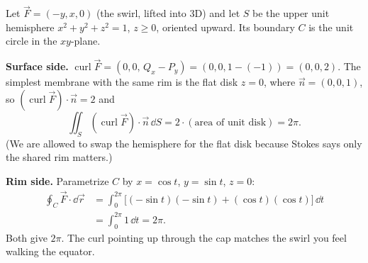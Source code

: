 \begin{example}
\label{ch35:ex-stokes}
Let $\vec F=(-y,x,0)$ (the swirl, lifted into 3D) and let $S$ be the upper unit
hemisphere $x^2+y^2+z^2=1$, $z\ge0$, oriented upward. Its boundary $C$ is the unit
circle in the $xy$-plane.

\textbf{Surface side.}
$\operatorname{curl}\vec F = (0,0,\,Q_x-P_y)=(0,0,1-(-1))=(0,0,2)$.
The simplest membrane with the same rim is the flat disk $z=0$, where
$\vec n=(0,0,1)$, so $(\operatorname{curl}\vec F)\cdot\vec n = 2$ and
\[
  \iint_S (\operatorname{curl}\vec F)\cdot\vec n\,\dd S = 2\cdot(\text{area of unit disk}) = 2\pi.
\]
(We are allowed to swap the hemisphere for the flat disk because Stokes
says only the shared rim matters.)

\textbf{Rim side.} Parametrize $C$ by $x=\cos t$, $y=\sin t$, $z=0$:
\begin{align*}
  \oint_C \vec F\cdot\dd\vec r
  &= \int_0^{2\pi}\big[(-\sin t)(-\sin t)+(\cos t)(\cos t)\big]\,\dd t\\
  &= \int_0^{2\pi} 1\,\dd t = 2\pi.
\end{align*}
Both give $2\pi$. The curl pointing up through the cap matches the swirl you
feel walking the equator.
\end{example}

